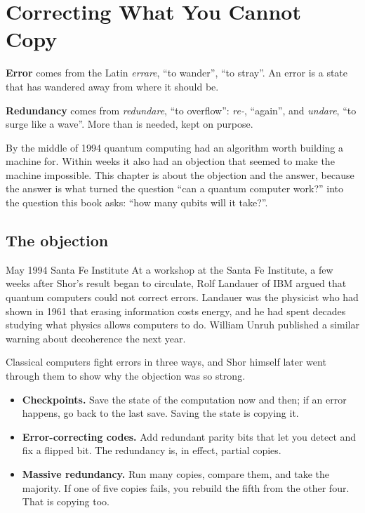 \chapter{Correcting What You Cannot Copy}\label{ch:qec}

\begin{etymology}
\textbf{Error} comes from the Latin \emph{errare}, ``to wander'', ``to stray''.
An error is a state that has wandered away from where it should be.

\textbf{Redundancy} comes from \emph{redundare}, ``to overflow'': \emph{re-},
``again'', and \emph{undare}, ``to surge like a wave''. More than is needed, kept
on purpose.
\end{etymology}

By the middle of 1994 quantum computing had an algorithm worth building a machine
for. Within weeks it also had an objection that seemed to make the machine
impossible. This chapter is about the objection and the answer, because the answer
is what turned the question ``can a quantum computer work?'' into the question this
book asks: ``how many qubits will it take?''.

\section{The objection}

\begin{history}{May 1994 \textperiodcentered{} Santa Fe Institute}
At a workshop at the Santa Fe Institute, a few weeks after Shor's result began to
circulate, Rolf Landauer of IBM argued that quantum computers could not correct
errors. Landauer was the physicist who had shown in 1961 that erasing information
costs energy, and he had spent decades studying what physics allows computers to
do. William Unruh published a similar warning about decoherence the next year.
\end{history}

Classical computers fight errors in three ways, and Shor himself later went through
them to show why the objection was so strong.

\begin{itemize}
\item \textbf{Checkpoints.} Save the state of the computation now and then; if an
error happens, go back to the last save. Saving the state is copying it.
\item \textbf{Error-correcting codes.} Add redundant parity bits that let you detect
and fix a flipped bit. The redundancy is, in effect, partial copies.
\item \textbf{Massive redundancy.} Run many copies, compare them, and take the
majority. If one of five copies fails, you rebuild the fifth from the other four.
That is copying too.
\end{itemize}

